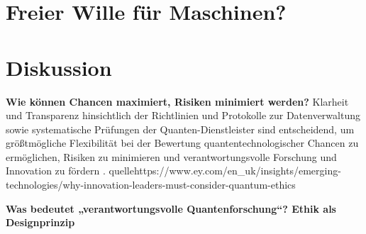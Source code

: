 \cite{umbrello_quantum_2024}


\section{Freier Wille für Maschinen?}



\section{Diskussion}

\textbf{Wie können Chancen maximiert, Risiken minimiert werden?}
Klarheit und Transparenz hinsichtlich der Richtlinien und Protokolle zur Datenverwaltung sowie systematische Prüfungen der Quanten-Dienstleister sind entscheidend, um größtmögliche Flexibilität bei der Bewertung quantentechnologischer Chancen zu ermöglichen, Risiken zu minimieren und verantwortungsvolle Forschung und Innovation zu fördern .
quelle{https://www.ey.com/en_uk/insights/emerging-technologies/why-innovation-leaders-must-consider-quantum-ethics}


\textbf{Was bedeutet „verantwortungsvolle Quantenforschung“?
Ethik als Designprinzip}

\printbibliography
